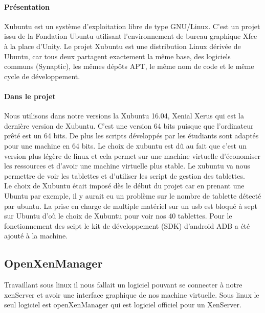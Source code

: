 \documentclass[a4paper,12pt]{article}
\begin{document}
\paragraph{Présentation\\}

Xubuntu est un système d'exploitation libre de type GNU/Linux. C'est un projet issu de la Fondation Ubuntu utilisant l'environnement de bureau graphique Xfce à la place d'Unity. Le projet Xubuntu est une distribution Linux dérivée de Ubuntu, car tous deux partagent exactement la même base, des logiciels communs (Synaptic), les mêmes dépôts APT, le même nom de code et le même cycle de développement.


\paragraph{Dans le projet\\}

Nous utilisons dans notre versions la Xubuntu 16.04, Xenial Xerus qui est la dernière version de Xubuntu. C’est une version 64 bits puisque que l’ordinateur prêté est un 64 bits. De plus les scripts développés par les étudiants sont adaptés pour une machine en 64 bits. Le choix de xubuntu est dû au fait que c’est un version plus légère de linux et cela permet sur une machine virtuelle d’économiser les ressources et d’avoir une machine virtuelle plus stable.
Le xubuntu va nous permettre de voir les tablettes et d’utiliser les script de gestion des tablettes. \\
Le choix de Xubuntu était imposé dès le début du projet car en prenant une Ubuntu par exemple, il y aurait eu  un problème sur le nombre de tablette détecté par ubuntu. La prise en charge de multiple matériel sur un usb est bloqué à sept sur Ubuntu d'où le choix de Xubuntu pour voir nos 40 tablettes. 
Pour le fonctionnement des scipt le kit de développement (SDK) d’android ADB a été ajouté à la machine.


\subsection{OpenXenManager}

Travaillant sous linux il nous fallait un logiciel pouvant se connecter à notre xenServer et avoir une interface graphique de nos machine virtuelle. Sous linux le seul logiciel est openXenManager qui est logiciel officiel pour un XenServer.
\end{document}
